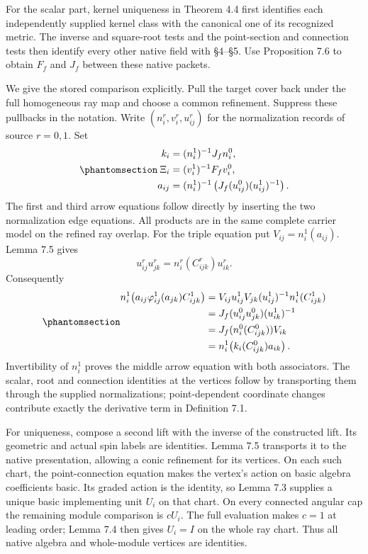 \documentclass[
  english,
  11pt,
  reqno]{amsart}
\begin{document}
For the scalar part, kernel uniqueness in Theorem 4.4 first identifies
each independently supplied kernel class with the canonical one of its
recognized metric. The inverse and square-root tests and the
point-section and connection tests then identify every other native
field with §4--§5. Use Proposition 7.6 to obtain \(F_f\) and \(J_f\)
between these native packets.

We give the stored comparison explicitly. Pull the target cover back
under the full homogeneous ray map and choose a common refinement.
Suppress these pullbacks in the notation. Write
\((n_i^r,v_i^r,u_{ij}^r)\) for the normalization records of source
\(r=0,1\). Set
\begin{equation}\protect\phantomsection\label{eq:global-stored-full-lift}{
\begin{aligned}
k_i&=(n_i^1)^{-1}J_f n_i^0,\\
\Xi_i&=(v_i^1)^{-1}F_f v_i^0,\\
a_{ij}&=(n_i^1)^{-1}
 \left(J_f(u_{ij}^0)(u_{ij}^1)^{-1}\right).
\end{aligned}
}\end{equation} The first and third arrow equations follow directly by
inserting the two normalization edge equations. All products are in the
same complete carrier model on the refined ray overlap. For the triple
equation put \(V_{ij}=n_i^1(a_{ij})\). Lemma 7.5 gives \[
u_{ij}^r u_{jk}^r=n_i^r(C_{ijk}^r)u_{ik}^r.
\] Consequently
\begin{equation}\protect\phantomsection\label{eq:global-stored-full-lift-triple-check}{
\begin{aligned}
n_i^1\!\left(a_{ij}\varphi_{ij}^1(a_{jk})C_{ijk}^1\right)
 &=V_{ij}u_{ij}^1V_{jk}(u_{ij}^1)^{-1}n_i^1(C_{ijk}^1)\\
 &=J_f(u_{ij}^0u_{jk}^0)(u_{ik}^1)^{-1}\\
 &=J_f(n_i^0(C_{ijk}^0))V_{ik}\\
 &=n_i^1\!\left(k_i(C_{ijk}^0)a_{ik}\right).
\end{aligned}
}\end{equation} Invertibility of \(n_i^1\) proves the middle arrow
equation with both associators. The scalar, root and connection
identities at the vertices follow by transporting them through the
supplied normalizations; point-dependent coordinate changes contribute
exactly the derivative term in Definition 7.1.

For uniqueness, compose a second lift with the inverse of the
constructed lift. Its geometric and actual spin labels are identities.
Lemma 7.5 transports it to the native presentation, allowing a conic
refinement for its vertices. On each such chart, the point-connection
equation makes the vertex's action on basic algebra coefficients basic.
Its graded action is the identity, so Lemma 7.3 supplies a unique basic
implementing unit \(U_i\) on that chart. On every connected angular cap
the remaining module comparison is \(cU_i\). The full evaluation makes
\(c=1\) at leading order; Lemma 7.4 then gives \(U_i=I\) on the whole
ray chart. Thus all native algebra and whole-module vertices are
identities.
\end{document}
